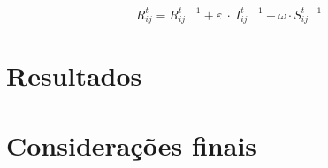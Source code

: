 \documentclass[
	11pt,				%
	openright,			%
	oneside,			%
	a4paper,			%
	english,			%
	french,				%
	spanish,			%
	brazil,				%
	]{abntex2}
\begin{document}
\begin{equation} \label{eq:vacineR}
R_{ij}^t=R_{ij}^{t\:-\:1}+\varepsilon \:\cdot \:I_{ij}^{t\:-\:1}+\omega \cdot S_{ij}^{t\:-1}
\end{equation}


\chapter{Resultados}

\chapter{Considerações finais}

%

% 

\postextual




%
%






\end{document}
